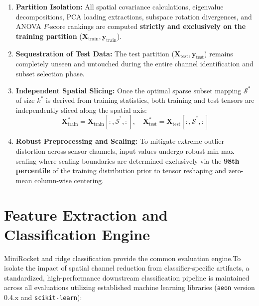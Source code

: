 \begin{enumerate}
    \item \textbf{Partition Isolation:} All spatial covariance calculations, eigenvalue decompositions, PCA loading extractions, subspace rotation divergences, and ANOVA $F$-score rankings are computed \textbf{strictly and exclusively on the training partition} ($\mathbf{X}_{\text{train}}, \mathbf{y}_{\text{train}}$).
    \item \textbf{Sequestration of Test Data:} The test partition ($\mathbf{X}_{\text{test}}, \mathbf{y}_{\text{test}}$) remains completely unseen and untouched during the entire channel identification and subset selection phase.
    \item \textbf{Independent Spatial Slicing:} Once the optimal sparse subset mapping $\mathcal{S}^*$ of size $k^*$ is derived from training statistics, both training and test tensors are independently sliced along the spatial axis:
    \begin{equation}
        \mathbf{X}_{\text{train}}^{*} = \mathbf{X}_{\text{train}}[:, \mathcal{S}^^*, :], \quad \mathbf{X}_{\text{test}}^{*} = \mathbf{X}_{\text{test}}[:, \mathcal{S}^^*, :]
    \end{equation}
    \item \textbf{Robust Preprocessing and Scaling:} To mitigate extreme outlier distortion across sensor channels, input values undergo robust min-max scaling where scaling boundaries are determined exclusively via the \textbf{98th percentile} of the training distribution prior to tensor reshaping and zero-mean column-wise centering.
\end{enumerate}

\section{Feature Extraction and Classification Engine}
\label{sec:classifier_engine}

\noindent
MiniRocket \citep{dempster2021minirocket} and ridge classification
\citep{hoerl1970ridge,pedregosa2011sklearn} provide the common evaluation
engine.To isolate the impact of spatial channel reduction from classifier-specific artifacts, a standardized, high-performance downstream classification pipeline is maintained across all evaluations utilizing established machine learning libraries (\texttt{aeon} version 0.4.x and \texttt{scikit-learn}):

